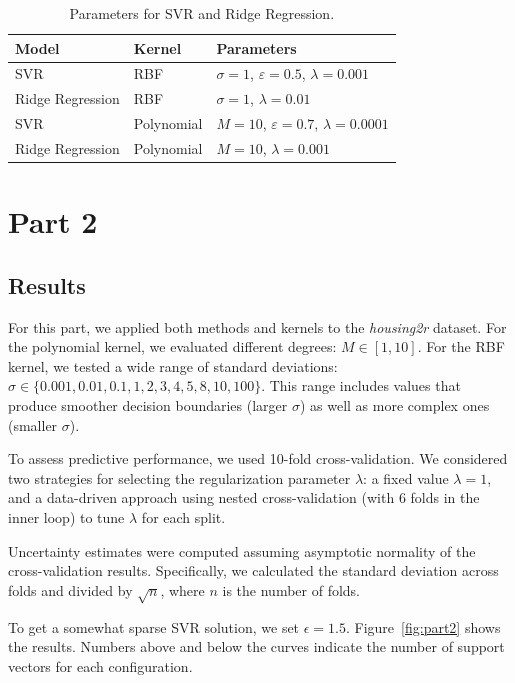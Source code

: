 \documentclass[9pt]{IEEEtran}
\begin{document}
\begin{table}[h]
\centering
\begin{tabular}{l|l|l}
Model & Kernel & Parameters \\
\hline
SVR & RBF & $\sigma=1$, $\varepsilon=0.5$, $\lambda=0.001$ \\
Ridge Regression & RBF & $\sigma=1$, $\lambda=0.01$ \\
SVR & Polynomial & $M=10$, $\varepsilon=0.7$, $\lambda=0.0001$ \\
Ridge Regression & Polynomial & $M=10$, $\lambda=0.001$ \\
\end{tabular}
\vspace{2pt}
\caption{Parameters for SVR and Ridge Regression.}
\label{tab:parameters}
\end{table}

\newpage
\section{Part 2}
\subsection{Results}
For this part, we applied both methods and kernels to
 the \textit{housing2r} dataset.  
For the polynomial kernel, we evaluated different degrees: \( M \in [1, 10] \).  
For the RBF kernel, we tested a wide range of standard deviations:  
\( \sigma \in \{0.001, 0.01, 0.1, 1, 2, 3, 4, 5, 8, 10, 100\} \). This
 range includes values that produce smoother decision boundaries 
(larger \(\sigma\)) as well as more complex ones (smaller \(\sigma\)).

To assess predictive performance, we used 10-fold cross-validation. 
We considered two strategies for selecting the regularization parameter
 \(\lambda\): a fixed value \(\lambda = 1\), and a data-driven approach 
 using nested cross-validation (with 6 folds in the inner loop) to tune 
 \(\lambda\) for each split.

Uncertainty estimates were computed assuming asymptotic normality of 
the cross-validation results. Specifically, we calculated the standard 
deviation across folds and divided by \(\sqrt{n}\), where \(n\) is 
the number of folds.

To get a somewhat sparse SVR solution, we set \(\epsilon = 1.5\).  
Figure~\ref{fig:part2} shows the results. Numbers above and below the 
curves indicate the number of support vectors for each configuration.
\end{document}
